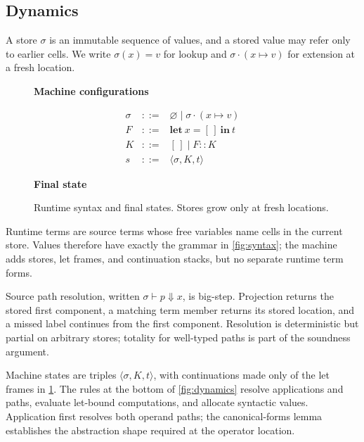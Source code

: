 \documentclass[acmsmall,screen,nonacm]{acmart}
\newcommand{\final}{\mathsf{final}}
\newcommand{\resolve}{\Downarrow}
\newcommand{\judgheader}[3][]{%
  \par\addvspace{0.75em}%
  \noindent\textbf{#2}%
  \if\relax\detokenize{#1}\relax\else\quad #1\fi
  \hfill{\setlength{\fboxsep}{4pt}\setlength{\fboxrule}{0.5pt}%
    \fbox{\(\strut #3\)}}\par
  \nobreak\addvspace{0.85em}%
}
\begin{document}
\subsection{Dynamics}
\label{sec:dynamics}

A store \(\sigma\) is an immutable sequence of values, and a stored value may
refer only to earlier cells. We write \(\sigma(x)=v\) for lookup and
\(\sigma\mathbin{\cdot}(x\mapsto v)\) for extension at a fresh location.

\begin{figure}[H]
\begin{minipage}{\textwidth}
\judgheader{Machine configurations}
  {s=\langle\sigma,K,t\rangle}
\[
\begin{array}{rcl}
\sigma &::=& \varnothing \mid \sigma\mathbin{\cdot}(x\mapsto v)\\
F &::=& \mathbf{let}\ x=[\,]\ \mathbf{in}\ t\\
K &::=& [\,] \mid F::K\\
s &::=& \langle\sigma,K,t\rangle
\end{array}
\]

\judgheader{Final state}{\final(s)}
\end{minipage}
\caption{Runtime syntax and final states. Stores grow only
at fresh locations.}
\label{fig:machine-syntax}
\end{figure}

Runtime terms are source terms whose free variables name cells in the current
store. Values therefore have exactly the grammar in \cref{fig:syntax}; the
machine adds stores, let frames, and continuation stacks, but no separate
runtime term forms.

Source path resolution, written \(\sigma\vdash p\resolve x\), is big-step.
Projection returns the stored first component, a matching term member returns
its stored location, and a missed label continues from the first component.
Resolution is deterministic but partial on arbitrary stores; totality for
well-typed paths is part of the soundness argument.

Machine states are triples \(\langle\sigma,K,t\rangle\), with continuations
made only of the let frames in \cref{fig:machine-syntax}. The rules at the
bottom of \cref{fig:dynamics}
resolve applications and paths, evaluate let-bound computations, and
allocate syntactic values. Application first resolves both operand paths; the
canonical-forms lemma establishes the abstraction shape required at the
operator location.
\end{document}
